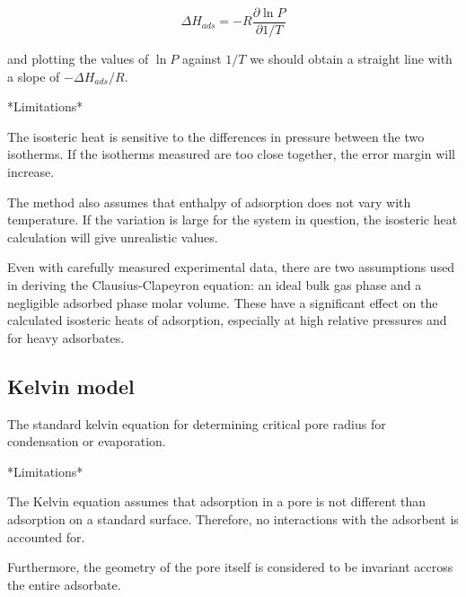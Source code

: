 \begin{equation}
    \Delta H_{ads} = - R \frac{\partial \ln P}{\partial 1 / T}
\end{equation}

and plotting the values of \(\ln P\) against \(1 / T\) we should obtain a straight
line with a slope of \(- \Delta H_{ads} / R.\)

*Limitations*

The isosteric heat is sensitive to the differences in pressure between the two isotherms. If
the isotherms measured are too close together, the error margin will increase.

The method also assumes that enthalpy of adsorption does not vary with temperature. If the
variation is large for the system in question, the isosteric heat calculation will give
unrealistic values.

Even with carefully measured experimental data, there are two assumptions used in deriving
the Clausius-Clapeyron equation: an ideal bulk gas phase and a negligible adsorbed phase
molar volume. These have a significant effect on the calculated isosteric heats of adsorption,
especially at high relative pressures and for heavy adsorbates.

\subsection{Kelvin model}

The standard kelvin equation for determining critical pore radius for condensation or
evaporation.

*Limitations*

The Kelvin equation assumes that adsorption in a pore is not different than adsorption
on a standard surface. Therefore, no interactions with the adsorbent is accounted for.

Furthermore, the geometry of the pore itself is considered to be invariant accross the
entire adsorbate.
